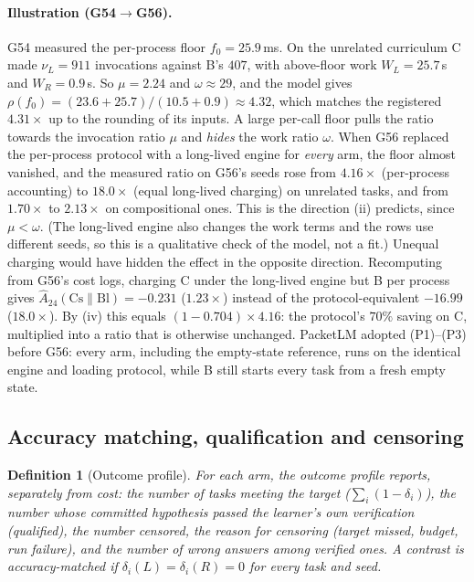 \documentclass[11pt]{article}
\newtheorem{definition}{Definition}
\theoremstyle{remark}
\begin{document}
\paragraph{Illustration (G54$\to$G56).} G54 measured the per-process floor $f_0=25.9$\,ms. On the unrelated curriculum C made $\nu_L=911$ invocations against B's $407$, with above-floor work $W_L=25.7$\,s and $W_R=0.9$\,s. So $\mu=2.24$ and $\omega\approx 29$, and the model gives $\rho(f_0)=(23.6+25.7)/(10.5+0.9)\approx4.32$, which matches the registered $4.31\times$ up to the rounding of its inputs. A large per-call floor pulls the ratio towards the invocation ratio $\mu$ and \emph{hides} the work ratio $\omega$. When G56 replaced the per-process protocol with a long-lived engine for \emph{every} arm, the floor almost vanished, and the measured ratio on G56's seeds rose from $4.16\times$ (per-process accounting) to $18.0\times$ (equal long-lived charging) on unrelated tasks, and from $1.70\times$ to $2.13\times$ on compositional ones. This is the direction (ii) predicts, since $\mu<\omega$. (The long-lived engine also changes the work terms and the rows use different seeds, so this is a qualitative check of the model, not a fit.)
Unequal charging would have hidden the effect in the opposite direction. Recomputing from G56's cost logs, charging C under the long-lived engine but B per process gives $\hat A_{24}(\text{Cs}\|\text{Bl})=-0.231$ ($1.23\times$) instead of the protocol-equivalent $-16.99$ ($18.0\times$). By (iv) this equals $(1-0.704)\times 4.16$: the protocol's $70\%$ saving on C, multiplied into a ratio that is otherwise unchanged. PacketLM adopted (P1)--(P3) before G56: every arm, including the empty-state reference, runs on the identical engine and loading protocol, while B still starts every task from a fresh empty state.

\subsection{Accuracy matching, qualification and censoring}\label{sec:matching}
\begin{definition}[Outcome profile]\label{def:profile}
For each arm, the \emph{outcome profile} reports, separately from cost: the number of tasks meeting the target ($\sum_i(1-\delta_i)$), the number whose committed hypothesis passed the learner's own verification (\emph{qualified}), the number censored, the reason for censoring (target missed, budget, run failure), and the number of wrong answers among verified ones. A contrast is \emph{accuracy-matched} if $\delta_i(L)=\delta_i(R)=0$ for every task and seed.
\end{definition}
\end{document}
